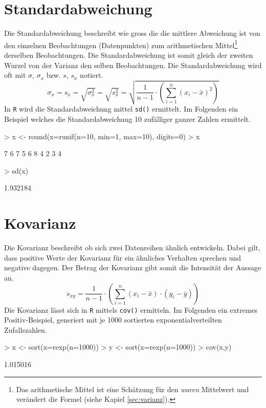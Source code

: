 \section{Standardabweichung}
Die \gls{Standardabweichung} beschreibt wie gross die die mittlere 
Abweichung ist von den einzelnen Beobachtungen (Datenpunkten) zum 
arithmetischen Mittel\footnote{Das arithmetische Mittel ist eine 
Schätzung für den
\emph{waren} Mittelwert und verändert die Formel 
(siehe Kapiel \ref{sec:varianz}).} 
derselben Beobachtungen. Die Standardabweichung ist somit gleich
der zweiten Wurzel von der Varianz den selben Beobachtungen. Die
Standardabweichung wird oft mit $\sigma$, $\sigma_x$ bzw. $s$, $s_x$ 
notiert.
\[
	\sigma_x 
	= s_x 
	= \sqrt{\sigma_{x}^2}
	= \sqrt{s_{x}^2}
	= \sqrt{\frac{1}{n-1} \cdot \left(
		\sum_{i=1}^n (x_i-\bar{x})^2 
	\right)}
\]
In \lstinline{R} wird die Standardabweichung mittel \lstinline{sd()}
ermittelt. Im Folgenden ein Beispiel welches die Standardabweichung
10 zufälliger ganzer Zahlen ermittelt.
\begin{Schunk}
\begin{Sinput}
> x <- round(x=runif(n=10, min=1, max=10), digits=0)
> x
\end{Sinput}
\begin{Soutput}
 [1] 7 6 7 5 6 8 4 2 3 4
\end{Soutput}
\begin{Sinput}
> sd(x)
\end{Sinput}
\begin{Soutput}
[1] 1.932184
\end{Soutput}
\end{Schunk}

\section{Kovarianz}
Die \gls{Kovarianz} beschreibt ob sich zwei Datenreihen ähnlich 
entwickeln. Dabei gilt, dass positive Werte der Kovarianz für ein 
ähnliches Verhalten sprechen und negative dagegen. Der Betrag der 
Kovarianz gibt somit die Intensität der Aussage an. 
\[  
	s_{xy} 
	= \frac{1}{n-1} \cdot \left( 
		\sum_{i=1}^n (x_i - \bar{x}) \cdot (y_i - \bar{y})
	\right)
\]
Die Kovarianz lässt sich in \lstinline{R} mittels \lstinline{cov()}
ermitteln. Im Folgenden ein extremes Positiv-Beispiel, generiert mit 
je 1000 sortierten exponentialverteilten Zufallszahlen. 
\begin{Schunk}
\begin{Sinput}
> x <- sort(x=rexp(n=1000))
> y <- sort(x=rexp(n=1000))
> cov(x,y)
\end{Sinput}
\begin{Soutput}
[1] 1.015016
\end{Soutput}
\end{Schunk}

